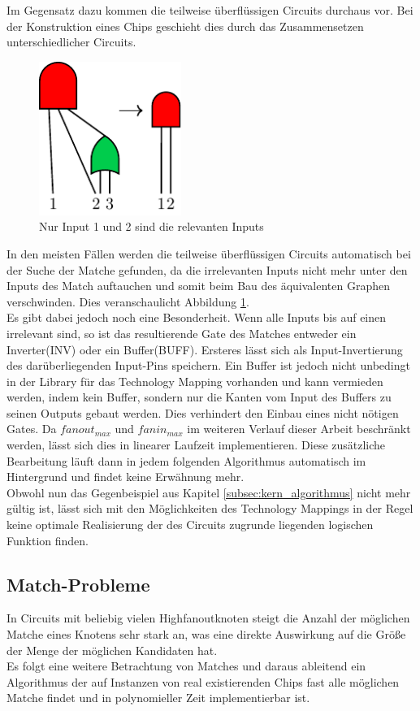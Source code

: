 \documentclass[11pt, a4paper, german]{article}
\newcommand{\TM}{Technology  Mapping }
\begin{document}
Im Gegensatz dazu kommen die teilweise überflüssigen Circuits durchaus vor. Bei der Konstruktion eines Chips geschieht dies durch das Zusammensetzen unterschiedlicher Circuits.\\
 \begin{figure}
		\includegraphics[height = 5cm]{pictures/compiled/partly_redundant}
		\caption{Nur Input 1 und 2 sind die relevanten Inputs}
		\label{bild:partly_redundant}
\end{figure}
In den meisten Fällen werden die teilweise überflüssigen Circuits automatisch bei der  Suche der Matche gefunden, da die irrelevanten Inputs nicht mehr unter den Inputs des Match auftauchen und somit beim Bau des äquivalenten Graphen verschwinden. Dies veranschaulicht Abbildung \ref{bild:partly_redundant}. \\
Es gibt dabei jedoch noch eine Besonderheit. Wenn alle Inputs bis auf einen irrelevant sind, so ist das resultierende Gate des Matches entweder ein Inverter(INV) oder ein Buffer(BUFF). Ersteres lässt sich als Input-Invertierung des darüberliegenden Input-Pins speichern. Ein Buffer ist jedoch nicht unbedingt in der Library für das \TM vorhanden und kann vermieden werden, indem kein Buffer, sondern nur die Kanten vom Input des Buffers zu seinen Outputs gebaut werden. Dies verhindert den Einbau eines nicht nötigen Gates. Da $fanout_{max}$ und $fanin_{max}$ im weiteren Verlauf dieser Arbeit beschränkt werden, lässt sich dies in linearer Laufzeit implementieren. Diese zusätzliche Bearbeitung läuft dann in jedem folgenden Algorithmus automatisch im Hintergrund und findet keine Erwähnung mehr.\\
 Obwohl nun das Gegenbeispiel aus Kapitel \ref{subsec:kern_algorithmus} nicht mehr gültig ist, lässt sich mit den Möglichkeiten des Technology Mappings in der Regel keine optimale Realisierung der des Circuits zugrunde liegenden logischen Funktion finden.
 
 
\subsection{Match-Probleme}
\label{subsec:match_kandidaten}
In Circuits mit beliebig vielen Highfanoutknoten steigt die Anzahl der möglichen Matche eines Knotens sehr stark an, was eine direkte Auswirkung auf die Größe der Menge der möglichen Kandidaten hat. \\
Es folgt eine weitere Betrachtung von Matches und daraus ableitend ein Algorithmus der auf Instanzen von real existierenden Chips fast alle möglichen Matche findet und in polynomieller Zeit implementierbar ist.
\end{document}
